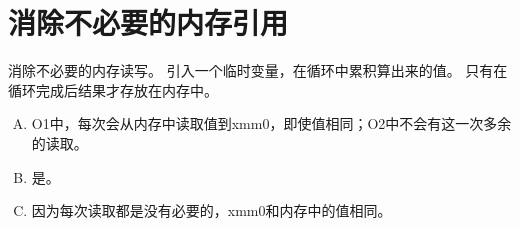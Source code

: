 
\section{消除不必要的内存引用}
{
    消除不必要的内存读写。
    引入一个临时变量，在循环中累积算出来的值。
    只有在循环完成后结果才存放在内存中。

    \begin{practicec}
        \begin{enumerate}[A.]
            \item O1中，每次会从内存中读取值到xmm0，即使值相同；O2中不会有这一次多余的读取。
            \item 是。
            \item 因为每次读取都是没有必要的，xmm0和内存中的值相同。
        \end{enumerate}
    \end{practicec}
}
